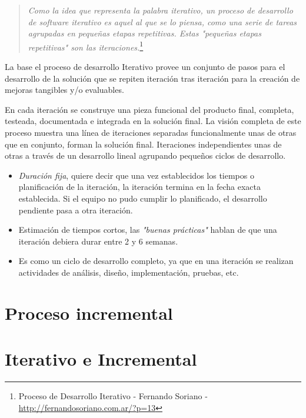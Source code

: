 \begin{quote}
    \emph{Como la idea que representa la palabra iterativo, un proceso de desarrollo de software iterativo es aquel al que se lo piensa, como una serie de tareas agrupadas en pequeñas etapas repetitivas. Estas "pequeñas etapas repetitivas" son las iteraciones.}\footnote{Proceso de Desarrollo Iterativo - Fernando Soriano - \url{http://fernandosoriano.com.ar/?p=13}}
\end{quote}

\par La base el proceso de desarrollo Iterativo provee un conjunto de pasos para el desarrollo de la solución que se repiten iteración tras iteración para la creación de mejoras tangibles y/o evaluables. 

\par En cada iteración se construye una pieza funcional del producto final, completa, testeada, documentada e integrada en la solución final. La visión completa de este proceso muestra una línea de iteraciones separadas funcionalmente unas de otras que en conjunto, forman la solución final. Iteraciones independientes unas de otras a través de un desarrollo lineal agrupando pequeños ciclos de desarrollo.

\begin{itemize}
	\item \emph{Duración fija}, quiere decir que una vez establecidos los tiempos o planificación de la iteración, la iteración termina en la fecha exacta establecida. Si el equipo no pudo cumplir lo planificado, el desarrollo pendiente pasa a otra iteración.
	\item Estimación de tiempos cortos, las \emph{"buenas prácticas"} hablan de que una iteración debiera durar entre 2 y 6 semanas.
	\item Es como un ciclo de desarrollo completo, ya que en una iteración se realizan actividades de análisis, diseño, implementación, pruebas, etc.
\end{itemize}


\section{Proceso incremental}
\label{sec:proc-incremental}


\section{Iterativo e Incremental}
\label{sec:iterativo-incremental}

